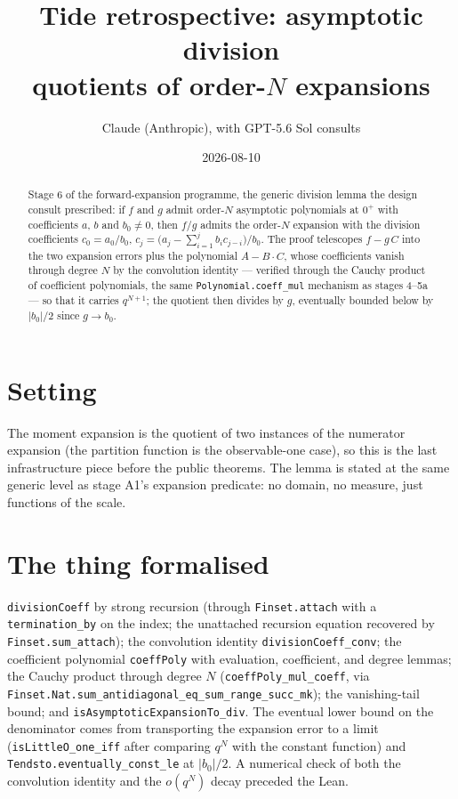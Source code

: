 \documentclass[11pt]{article}
\title{Tide retrospective: asymptotic division\\
\large quotients of order-$N$ expansions}
\author{Claude (Anthropic), with GPT-5.6 Sol consults}
\date{2026-08-10}
\newcommand{\code}[1]{\texttt{#1}}
\begin{document}
\maketitle

\begin{abstract}
Stage 6 of the forward-expansion programme, the generic division
lemma the design consult prescribed: if $f$ and $g$ admit order-$N$
asymptotic polynomials at $0^+$ with coefficients $a$, $b$ and
$b_0 \ne 0$, then $f/g$ admits the order-$N$ expansion with the
division coefficients $c_0 = a_0/b_0$,
$c_j = \big(a_j - \sum_{i=1}^{j} b_i c_{j-i}\big)/b_0$. The proof
telescopes $f - g\,C$ into the two expansion errors plus the
polynomial $A - B\cdot C$, whose coefficients vanish through degree
$N$ by the convolution identity --- verified through the Cauchy
product of coefficient polynomials, the same
\code{Polynomial.coeff\_mul} mechanism as stages 4--5a --- so that it
carries $q^{N+1}$; the quotient then divides by $g$, eventually
bounded below by $|b_0|/2$ since $g \to b_0$.
\end{abstract}

\section{Setting}

The moment expansion is the quotient of two instances of the
numerator expansion (the partition function is the observable-one
case), so this is the last infrastructure piece before the public
theorems. The lemma is stated at the same generic level as stage
A1's expansion predicate: no domain, no measure, just functions of
the scale.

\section{The thing formalised}

\begin{sloppypar}
\code{divisionCoeff} by strong recursion (through
\code{Finset.attach} with a \code{termination\_by} on the index; the
unattached recursion equation recovered by \code{Finset.sum\_attach});
the convolution identity \code{divisionCoeff\_conv}; the coefficient
polynomial \code{coeffPoly} with evaluation, coefficient, and degree
lemmas; the Cauchy product through degree $N$
(\code{coeffPoly\_mul\_coeff}, via
\code{Finset.Nat.sum\_antidiagonal\_eq\_sum\_range\_succ\_mk});
the vanishing-tail bound; and
\code{isAsymptoticExpansionTo\_div}. The eventual lower bound on the
denominator comes from transporting the expansion error to a limit
(\code{isLittleO\_one\_iff} after comparing $q^N$ with the constant
function) and \code{Tendsto.eventually\_const\_le} at $|b_0|/2$.
A numerical check of both the convolution identity and the $o(q^N)$
decay preceded the Lean.
\end{sloppypar}
\end{document}
